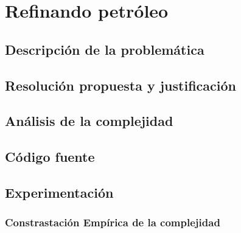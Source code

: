 \section{Refinando petr\'oleo}
\subsection{Descripci\'on de la problem\'atica}
\subsection{Resoluci\'on propuesta y justificaci\'on}
\subsection{An\'alisis de la complejidad}
\subsection{C\'odigo fuente}
\subsection{Experimentaci\'on}

\subsubsection{Constrastaci\'on Emp\'irica de la complejidad}